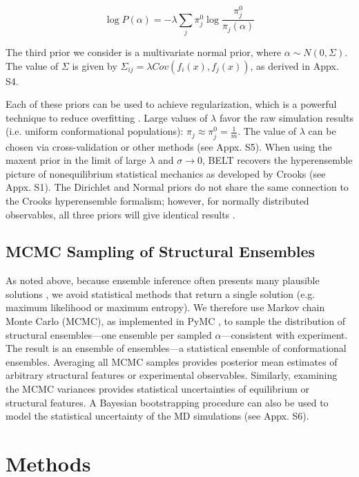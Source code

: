 \documentclass[12pt]{article}
\begin{document}
$$\log P(\alpha) = -\lambda \sum_j \pi_j^0 \log \frac{\pi_j^0}{\pi_j(\alpha)}$$

The third prior we consider is a multivariate normal prior, where  $\alpha \sim N(0, \Sigma)$.  The value of $\Sigma$ is given by $\Sigma_{ij} = \lambda Cov(f_i(x), f_j(x))$, as derived in Appx. S4.

Each of these priors can be used to achieve regularization, which is a powerful technique to reduce overfitting \cite{friedman2001elements}.  Large values of $\lambda$ favor the raw simulation results (i.e. uniform conformational populations): $\pi_j \approx \pi_j^0 = \frac{1}{m}$.  The value of $\lambda$ can be chosen via cross-validation or other methods (see Appx. S5).  When using the maxent prior in the limit of large $\lambda$ and $\sigma \rightarrow 0$, BELT recovers the hyperensemble picture of nonequilibrium statistical mechanics as developed \cite{crooks2007beyond} by Crooks (see Appx. S1).  The Dirichlet and Normal priors do not share the same connection to the Crooks hyperensemble formalism; however, for normally distributed observables, all three priors will give identical results \cite{relative_entropy_wiki}.  

\subsection*{MCMC Sampling of Structural Ensembles}

As noted above, because ensemble inference often presents many plausible solutions  \cite{fisher2010, fisher2011constructing, rieping2005}, we avoid statistical methods that return a single solution (e.g. maximum likelihood or maximum entropy).  We therefore use Markov chain Monte Carlo (MCMC), as implemented in PyMC  \cite{patil2010pymc}, to sample the distribution of structural ensembles---one ensemble per sampled $\alpha$---consistent with experiment.  The result is an ensemble of ensembles---a statistical ensemble of conformational ensembles.  Averaging all MCMC samples provides posterior mean  estimates of arbitrary structural features or experimental observables.  Similarly, examining the MCMC variances provides statistical uncertainties of equilibrium or structural features.  A Bayesian bootstrapping procedure  \cite{rubin1981} can also be used to model the statistical uncertainty of the MD simulations (see Appx. S6).

\section*{Methods}
\end{document}
